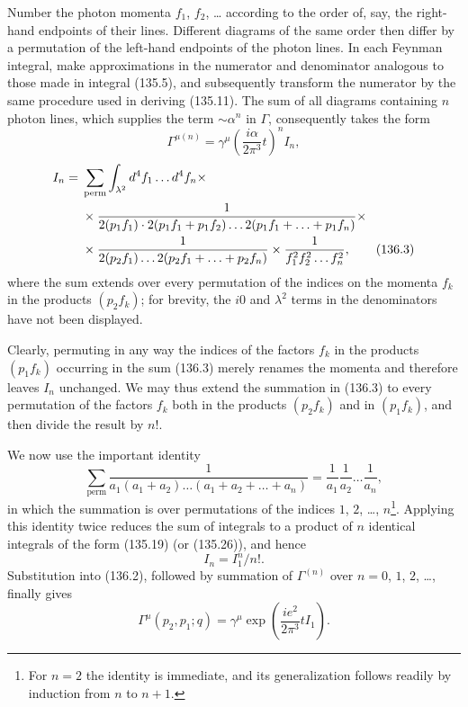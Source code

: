 Number the photon momenta $f_1$, $f_2$, \ldots{} according to the order of, say, the right-hand endpoints of their lines. Different diagrams of the same order then differ by a permutation of the left-hand endpoints of the photon lines. In each Feynman integral, make approximations in the numerator and denominator analogous to those made in integral (135.5), and subsequently transform the numerator by the same procedure used in deriving (135.11). The sum of all diagrams containing $n$ photon lines, which supplies the term $\sim\alpha^n$ in $\Gamma$, consequently takes the form
\begin{equation}
\Gamma^{\mu(n)}=\gamma^\mu\left(\frac{i\alpha}{2\pi^3}t\right)^n I_n,
\tag{136.2}
\end{equation}
\begin{align}
I_n={}&\sum_{\text{perm}}
\int_{\lambda^2}d^4f_1\ldots d^4f_n\times\notag\\
&\times\frac{1}{2(p_1f_1)\cdot2(p_1f_1+p_1f_2)\ldots
2(p_1f_1+\ldots+p_1f_n)}\times\notag\\
&\times\frac{1}{2(p_2f_1)\ldots2(p_2f_1+\ldots+p_2f_n)}
\times\frac{1}{f_1^2f_2^2\ldots f_n^2},
\tag{136.3}
\end{align}
where the sum extends over every permutation of the indices on the momenta $f_k$ in the products $(p_2f_k)$; for brevity, the $i0$ and $\lambda^2$ terms in the denominators have not been displayed.

Clearly, permuting in any way the indices of the factors $f_k$ in the products $(p_1f_k)$ occurring in the sum (136.3) merely renames the momenta and therefore leaves $I_n$ unchanged. We may thus extend the summation in (136.3) to every permutation of the factors $f_k$ both in the products $(p_2f_k)$ and in $(p_1f_k)$, and then divide the result by $n!$.

We now use the important identity
\begin{equation}
\sum_{\text{perm}}\frac{1}{a_1(a_1+a_2)\ldots(a_1+a_2+\ldots+a_n)}
=\frac{1}{a_1}\frac{1}{a_2}\ldots\frac{1}{a_n},
\tag{136.4}
\end{equation}
in which the summation is over permutations of the indices $1$, $2$, \ldots, $n$\footnote{For $n=2$ the identity is immediate, and its generalization follows readily by induction from $n$ to $n+1$.}. Applying this identity twice reduces the sum of integrals to a product of $n$ identical integrals of the form (135.19) (or (135.26)), and hence
\begin{equation}
I_n=I_1^n/n!.
\tag{136.5}
\end{equation}
Substitution into (136.2), followed by summation of $\Gamma^{(n)}$ over $n=0$, $1$, $2$, \ldots, finally gives
\begin{equation}
\Gamma^\mu(p_2,p_1;q)=\gamma^\mu\exp\left(\frac{ie^2}{2\pi^3}tI_1\right).
\tag{136.6}
\end{equation}


